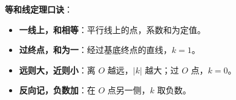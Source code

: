 \begin{summarybox}
\textbf{等和线定理口诀}：
\begin{itemize}
    \item \textbf{一线上，和相等}：平行线上的点，系数和为定值。
    \item \textbf{过终点，和为一}：经过基底终点的直线，$k=1$。
    \item \textbf{远则大，近则小}：离 $O$ 越远，$|k|$ 越大；过 $O$ 点，$k=0$。
    \item \textbf{反向记，负数加}：在 $O$ 点另一侧，$k$ 取负数。
\end{itemize}
\end{summarybox}